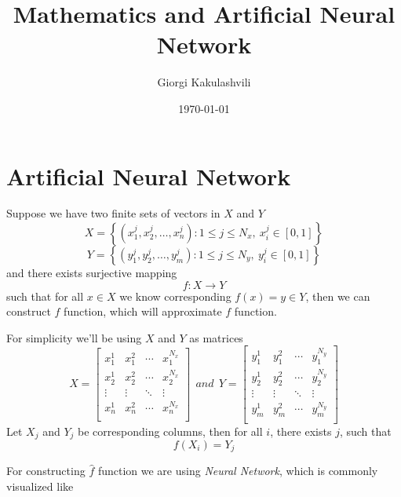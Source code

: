 \documentclass{article}
\numberwithin{equation}{section}
\theoremstyle{definition}
\theoremstyle{remark}
\begin{document}
\title{Mathematics and Artificial Neural Network}
\author{Giorgi Kakulashvili}
\date{\today}
\maketitle
\thispagestyle{fancy}



\tableofcontents

\newpage


\section{Artificial Neural Network}

Suppose we have two finite sets of vectors in $X$ and $Y$
\[
    X = \left\{ \left( x_1^{j}, x_2^{j},\dots, x_n^{j} \right) : 1 \le j \le N_{x},~ x_{i}^{j} \in [0,1]  \right\}
\]
\[
    Y = \left\{ \left( y_1^{j}, y_2^{j},\dots, y_m^{j} \right) : 1 \le j \le N_{y},~ y_{i}^{j} \in [0,1] \right\}
\]
and there exists surjective mapping
\[
    f: X\to Y
\]
such that for all $x\in X$ we know corresponding $f(x)=y\in Y$, then we can construct $\hat{f}$ function, which will approximate $f$ function.

For simplicity we'll be using $X$ and $Y$ as matrices
\[
    X = \begin{bmatrix}
        x_{1}^1 & x_{1}^2 & \cdots & x_{1}^{N_x} \\
        x_{2}^1 & x_{2}^2 & \cdots & x_{2}^{N_x} \\
        \vdots & \vdots & \ddots & \vdots \\
        x_{n}^1 & x_{n}^2 & \cdots & x_{n}^{N_x} \\
    \end{bmatrix}
    ~~\textit{and}~~
    Y = \begin{bmatrix}
        y_{1}^1 & y_{1}^2 & \cdots & y_{1}^{N_y} \\
        y_{2}^1 & y_{2}^2 & \cdots & y_{2}^{N_y} \\
        \vdots & \vdots & \ddots & \vdots \\
        y_{m}^1 & y_{m}^2 & \cdots & y_{m}^{N_y} \\
    \end{bmatrix}
\]
Let $X_{j}$ and $Y_{j}$ be corresponding columns, then for all $i$, there exists $j$, such that
\[
    f(X_{i}) = Y_{j}
\]

For constructing $\hat{f}$ function we are using \textit{Neural Network}, which is commonly visualized like
\end{document}
